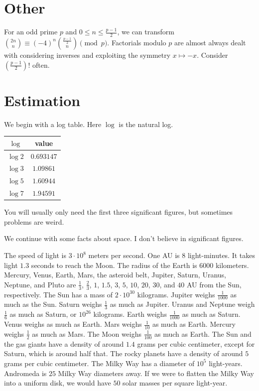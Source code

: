 \documentclass[11pt]{scrartcl}
\begin{document}
\section{Other}

\begin{itemize}
    \ii For an odd prime $p$ and $0 \le n \le \frac{p - 1}2$, we can transform $\binom{2n}n \equiv (-4)^n\binom{\frac{p - 1}2}n \pmod p$.
    \ii Factorials modulo $p$ are almost always dealt with considering inverses and exploiting the symmetry $x \mapsto -x$. Consider $(\frac{p - 1}2)!$ often.
\end{itemize}

\section{Estimation}

We begin with a log table. Here $\log$ is the natural log.
\begin{center}
\begin{tabular}{c|c}
$\log$ & value \\ \hline
$\log 2$ & $0.693147$ \\
$\log 3$ & $1.09861$ \\
$\log 5$ & $1.60944$ \\
$\log 7$ & $1.94591$
\end{tabular}
\end{center}
You will usually only need the first three significant figures, but sometimes problems are weird.

We continue with some facts about space. I don't believe in significant figures.
\begin{itemize}
    \ii The speed of light is $3 \cdot 10^8$ meters per second.
    \ii One AU is $8$ light-minutes. It takes light $1.3$ seconds to reach the Moon.
    \ii The radius of the Earth is $6000$ kilometers.
    \ii Mercury, Venus, Earth, Mars, the asteroid belt, Jupiter, Saturn, Uranus, Neptune, and Pluto are $\frac13$, $\frac23$, $1$, $1.5$, $3$, $5$, $10$, $20$, $30$, and $40$ AU from the Sun, respectively.
    \ii The Sun has a mass of $2 \cdot 10^{30}$ kilograms.
    \ii Jupiter weighs $\frac1{1000}$ as much as the Sun. Saturn weighs $\frac13$ as much as Jupiter. Uranus and Neptune weigh $\frac16$ as much as Saturn, or $10^{26}$ kilograms.
    \ii Earth weighs $\frac1{1000}$ as much as Saturn. Venus weighs as much as Earth. Mars weighs $\frac1{10}$ as much as Earth. Mercury weighs $\frac12$ as much as Mars. The Moon weighs $\frac1{100}$ as much as Earth.
    \ii The Sun and the gas giants have a density of around $1.4$ grams per cubic centimeter, except for Saturn, which is around half that. The rocky planets have a density of around $5$ grams per cubic centimeter.
    \ii The Milky Way has a diameter of $10^5$ light-years. Andromeda is $25$ Milky Way diameters away. If we were to flatten the Milky Way into a uniform disk, we would have $50$ solar masses per square light-year.
\end{itemize}
\end{document}
